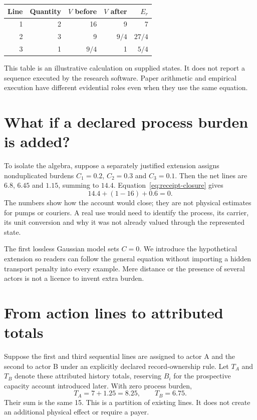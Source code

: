 \begin{center}
\begin{tabular}{rrrrr}\toprule
Line & Quantity & $V$ before & $V$ after & $E_r$\\\midrule
1 & 2 & 16 & 9 & 7\\
2 & 3 & 9 & $9/4$ & $27/4$\\
3 & 1 & $9/4$ & 1 & $5/4$\\\bottomrule
\end{tabular}
\end{center}

This table is an illustrative calculation on supplied states. It does not report a sequence executed by the research software. Paper arithmetic and empirical execution have different evidential roles even when they use the same equation.


\section{What if a declared process burden is added?}
To isolate the algebra, suppose a separately justified extension assigns nonduplicated burdens $C_1=0.2$, $C_2=0.3$ and $C_3=0.1$. Then the net lines are $6.8$, $6.45$ and $1.15$, summing to $14.4$. Equation~\eqref{eq:receipt-closure} gives
\[
 14.4+(1-16)+0.6=0.
\]
The numbers show how the account would close; they are not physical estimates for pumps or couriers. A real use would need to identify the process, its carrier, its unit conversion and why it was not already valued through the represented state.

The first lossless Gaussian model sets $C=0$. We introduce the hypothetical extension so readers can follow the general equation without importing a hidden transport penalty into every example. Mere distance or the presence of several actors is not a licence to invent extra burden.

\section{From action lines to attributed totals}
Suppose the first and third sequential lines are assigned to actor A and the second to actor B under an explicitly declared record-ownership rule. Let $T_A$ and $T_B$ denote these attributed history totals, reserving $B_i$ for the prospective capacity account introduced later. With zero process burden,
\[
 T_A=7+1.25=8.25,\qquad T_B=6.75.
\]
Their sum is the same 15. This is a partition of existing lines. It does not create an additional physical effect or require a payer.

